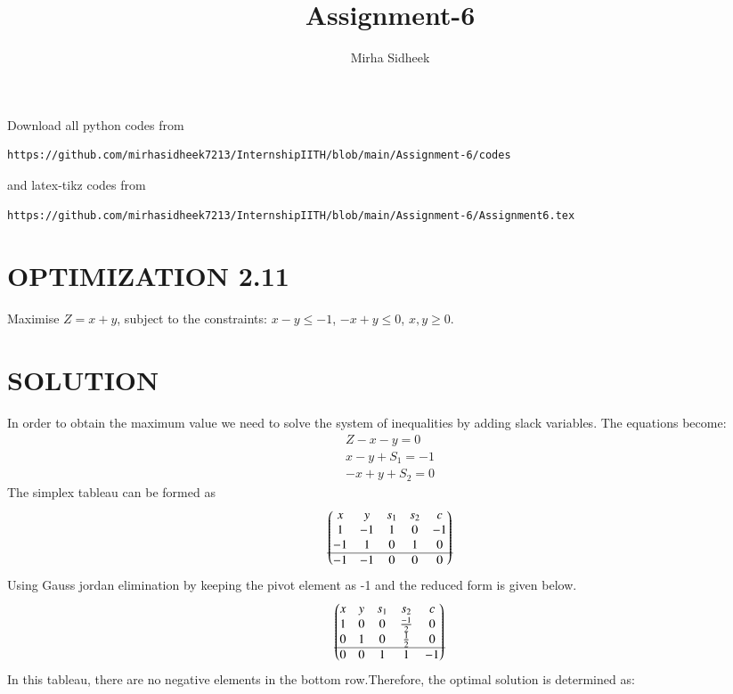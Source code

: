 \documentclass[journal,12pt,twocolumn]{IEEEtran}
\begin{document}
     \def\rightbox#1{\makebox[0in][r]{#1}}
     \def\centbox#1{\makebox[0in]{#1}}
     \def\topbox#1{\raisebox{-\baselineskip}[0in][0in]{#1}}
     \def\midbox#1{\raisebox{-0.5\baselineskip}[0in][0in]{#1}}
\vspace{3cm}
\title{Assignment-6}
\author{Mirha Sidheek}
\maketitle
\newpage
\bigskip
\renewcommand{\thefigure}{\theenumi}
\renewcommand{\thetable}{\theenumi}
%
  Download all python codes from 
\begin{lstlisting}
https://github.com/mirhasidheek7213/InternshipIITH/blob/main/Assignment-6/codes
\end{lstlisting}
%
and latex-tikz codes from 
%
\begin{lstlisting}
https://github.com/mirhasidheek7213/InternshipIITH/blob/main/Assignment-6/Assignment6.tex
\end{lstlisting}
%
\section{OPTIMIZATION 2.11}
Maximise $Z=x+y$, subject to the constraints: $x-y \leq -1$, $-x+y \leq 0$, $x,y\geq0$.
\section{SOLUTION}

In order to obtain the maximum value we need to solve the system of inequalities by adding slack variables. The equations become:
\begin{align}
     Z - x- y =0
    \\
    x - y + S_1 = -1
    \\
    -x + y + S_2 = 0
\end{align}
The simplex tableau can be formed as
\begin{align}
    \begin{pmatrix}x & y & s_1 & s_2 & c \\
    1 & -1 & 1 & 0 & -1 \\
    -1 & 1 & 0 & 1 & 0 \\\hline
    -1 & -1 & 0 & 0 & 0\end{pmatrix}
\end{align}
Using Gauss jordan elimination by keeping the pivot element as -1 and the reduced form is given below.
\begin{align}
     \begin{pmatrix}x & y & s_1 & s_2 & c \\
    1 & 0 & 0 & \frac{-1}{2} & 0 \\
    0 & 1 & 0 & \frac{1}{2} & 0 \\\hline
    0 & 0 & 1 & 1 & -1\end{pmatrix}
\end{align}
In this tableau, there are no negative elements
in the bottom row.Therefore, the optimal solution is determined as:
\end{document}
